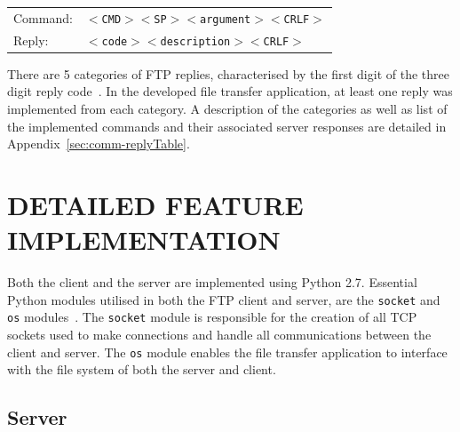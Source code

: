 \documentclass[10pt,twocolumn]{witseiepaper}
\begin{document}
\begin{tabular}{ll}
	Command:& \texttt{$<$CMD$>$$<$SP$>$$<$argument$>$$<$CRLF$>$} \\[5pt]
	Reply:& \texttt{$<$code$>$$<$description$>$$<$CRLF$>$} \\[5pt]
\end{tabular} 

There are 5 categories of FTP replies, characterised by the first digit of the three digit reply code~\cite{rfc959}. In the developed file transfer application, at least one reply was implemented from each category. A description of the categories as well as list of the implemented commands and their associated server responses are detailed in Appendix~\ref{sec:comm-replyTable}.

%
%
%
%



\section{DETAILED FEATURE IMPLEMENTATION} %

Both the client and the server are implemented using Python 2.7. Essential Python modules utilised in both the FTP client and server, are the \texttt{socket} and \texttt{os} modules~\cite{osModule,socketModule}. The \texttt{socket} module is responsible for the creation of all TCP sockets used to make connections and handle all communications between the client and server. The \texttt{os} module enables the file transfer application to interface with the file system of both the server and client.

\vspace*{-2mm}
\subsection{Server}
\end{document}
